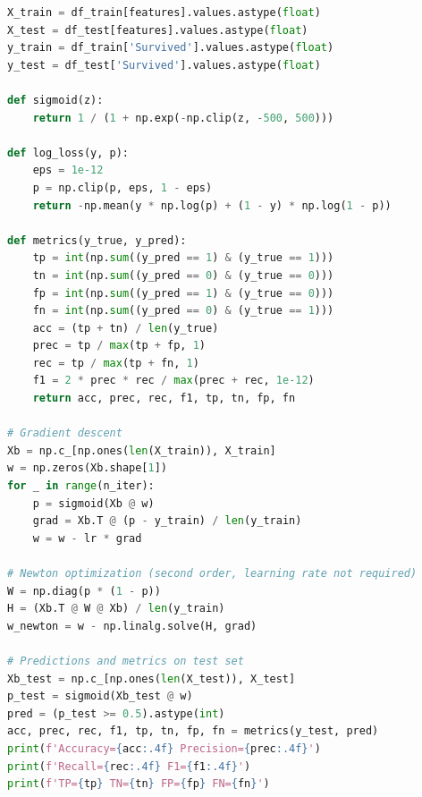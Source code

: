 \documentclass[12pt,a4paper]{article}
\begin{document}
\begin{lstlisting}[language=Python, frame=single, basicstyle=\footnotesize\ttfamily]
X_train = df_train[features].values.astype(float)
X_test = df_test[features].values.astype(float)
y_train = df_train['Survived'].values.astype(float)
y_test = df_test['Survived'].values.astype(float)

def sigmoid(z):
    return 1 / (1 + np.exp(-np.clip(z, -500, 500)))

def log_loss(y, p):
    eps = 1e-12
    p = np.clip(p, eps, 1 - eps)
    return -np.mean(y * np.log(p) + (1 - y) * np.log(1 - p))

def metrics(y_true, y_pred):
    tp = int(np.sum((y_pred == 1) & (y_true == 1)))
    tn = int(np.sum((y_pred == 0) & (y_true == 0)))
    fp = int(np.sum((y_pred == 1) & (y_true == 0)))
    fn = int(np.sum((y_pred == 0) & (y_true == 1)))
    acc = (tp + tn) / len(y_true)
    prec = tp / max(tp + fp, 1)
    rec = tp / max(tp + fn, 1)
    f1 = 2 * prec * rec / max(prec + rec, 1e-12)
    return acc, prec, rec, f1, tp, tn, fp, fn

# Gradient descent
Xb = np.c_[np.ones(len(X_train)), X_train]
w = np.zeros(Xb.shape[1])
for _ in range(n_iter):
    p = sigmoid(Xb @ w)
    grad = Xb.T @ (p - y_train) / len(y_train)
    w = w - lr * grad

# Newton optimization (second order, learning rate not required)
W = np.diag(p * (1 - p))
H = (Xb.T @ W @ Xb) / len(y_train)
w_newton = w - np.linalg.solve(H, grad)

# Predictions and metrics on test set
Xb_test = np.c_[np.ones(len(X_test)), X_test]
p_test = sigmoid(Xb_test @ w)
pred = (p_test >= 0.5).astype(int)
acc, prec, rec, f1, tp, tn, fp, fn = metrics(y_test, pred)
print(f'Accuracy={acc:.4f} Precision={prec:.4f}')
print(f'Recall={rec:.4f} F1={f1:.4f}')
print(f'TP={tp} TN={tn} FP={fp} FN={fn}')
\end{lstlisting}
\end{document}
